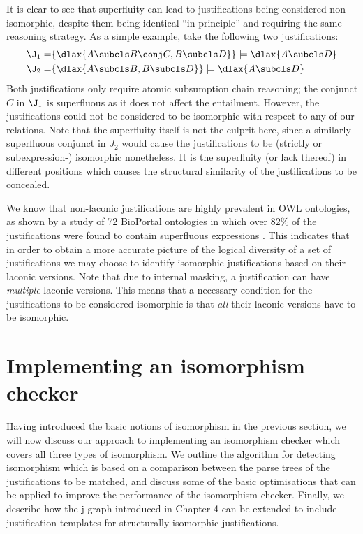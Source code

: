 It is clear to see that superfluity can lead to justifications being considered non-isomorphic, despite them being identical \enquote{in principle} and requiring the same reasoning strategy. As a simple example, take the following two justifications:
\begin{align*}
\J_{1} = & \{\dlax{A \subcls B \conj C, B \subcls D}\} \models \dlax{A \subcls D}\\
\J_{2} = & \{\dlax{A \subcls B, B \subcls D}\} \models \dlax{A \subcls D}
\end{align*}
Both justifications only require atomic subsumption chain reasoning; the conjunct $C$ in $\J_{1}$ is superfluous as it does not affect the entailment. However, the justifications could not be considered to be isomorphic with respect to any of our relations. Note that the superfluity itself is not the culprit here, since a similarly superfluous conjunct in $J_{2}$ would cause the justifications to be (strictly or subexpression-) isomorphic nonetheless. It is the superfluity (or lack thereof) in different positions which causes the structural similarity of the justifications to be concealed.

We know that non-laconic justifications are highly prevalent in OWL ontologies, as shown by a study of 72 BioPortal ontologies in which over 82\% of the justifications were found to contain superfluous expressions \cite{horridge11ab}. This indicates that in order to obtain a more accurate picture of the logical diversity of a set of justifications we may choose to identify isomorphic justifications based on their laconic versions. Note that due to internal masking, a justification can have \emph{multiple} laconic versions. This means that a necessary condition for the  justifications to be considered isomorphic is that \emph{all} their laconic versions have to be isomorphic.




\section{Implementing an isomorphism checker}

Having introduced the basic notions of isomorphism in the previous section, we will now discuss our approach to implementing an isomorphism checker which covers all three types of isomorphism. We outline the algorithm for detecting isomorphism which is based on a comparison between the parse trees of the justifications to be matched, and discuss some of the basic optimisations that can be applied to improve the performance of the isomorphism checker. Finally, we describe how the j-graph introduced in Chapter 4 can be extended to include justification templates for structurally isomorphic justifications.

